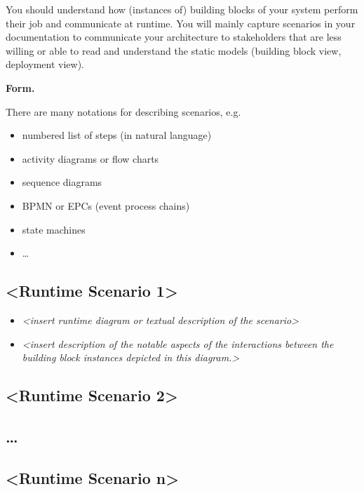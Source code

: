 \documentclass[]{article}
\begin{document}
You should understand how (instances of) building blocks of your system
perform their job and communicate at runtime. You will mainly capture
scenarios in your documentation to communicate your architecture to
stakeholders that are less willing or able to read and understand the
static models (building block view, deployment view).

\textbf{Form.}

There are many notations for describing scenarios, e.g.

\begin{itemize}
\item
  numbered list of steps (in natural language)
\item
  activity diagrams or flow charts
\item
  sequence diagrams
\item
  BPMN or EPCs (event process chains)
\item
  state machines
\item
  \ldots{}
\end{itemize}

\hypertarget{__runtime_scenario_1}{%
\subsection{\textless{}Runtime Scenario
1\textgreater{}}\label{__runtime_scenario_1}}

\begin{itemize}
\item
  \emph{\textless{}insert runtime diagram or textual description of the
  scenario\textgreater{}}
\item
  \emph{\textless{}insert description of the notable aspects of the
  interactions between the building block instances depicted in this
  diagram.\textgreater{}}
\end{itemize}

\hypertarget{__runtime_scenario_2}{%
\subsection{\textless{}Runtime Scenario
2\textgreater{}}\label{__runtime_scenario_2}}

\hypertarget{_}{%
\subsection{\ldots{}}\label{_}}

\hypertarget{__runtime_scenario_n}{%
\subsection{\textless{}Runtime Scenario
n\textgreater{}}\label{__runtime_scenario_n}}
\end{document}
